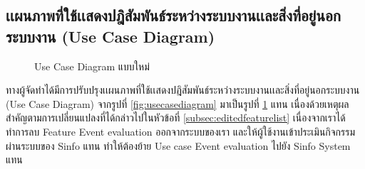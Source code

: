 \documentclass[14pt,oneside,openright,a4paper]{cpe-thai-project}
\begin{document}
  \subsection{เเผนภาพที่ใช้เเสดงปฎิสัมพันธ์ระหว่างระบบงานเเละสิ่งที่อยู่นอกระบบงาน (Use Case Diagram)}
   \begin{figure}[H]\centering
    \setlength{\fboxrule}{0.5mm} %
    \setlength{\fboxsep}{0.5cm}
    \caption{Use Case Diagram แบบใหม่}\label{fig:editedusecasediagram}
   \end{figure}
  
   ทางผู้จัดทำได้มีการปรับปรุงเเผนภาพที่ใช้เเสดงปฎิสัมพันธ์ระหว่างระบบงานเเละสิ่งที่อยู่นอกระบบงาน (Use Case Diagram) จากรูปที่ \ref{fig:usecasediagram} มาเป็นรูปที่ \ref{fig:editedusecasediagram} แทน 
   เนื่องด้วยเหตุผลสำคัญตามการเปลี่ยนแปลงที่ได้กล่าวไปในหัวข้อที่ \ref{subsec:editedfeaturelist} เนื่องจากเราได้ทำการลบ Feature Event evaluation ออกจากระบบของเรา และให้ผู้ใช้งานเข้าประเมินกิจกรรมผ่านระบบของ Sinfo แทน
   ทำให้ต้องย้าย Use case Event evaluation ไปยัง Sinfo System แทน
   
\end{document}
